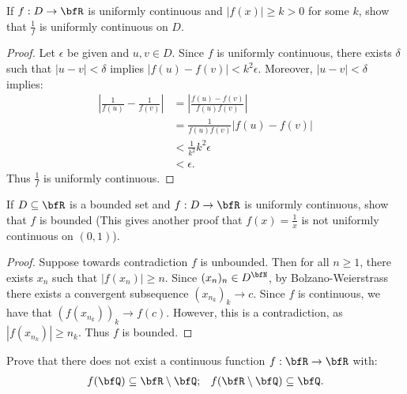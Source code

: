 \documentclass[11pt,twoside,openany]{memoir}
\begin{document}
    \begin{exercise}
        If $f:D \rightarrow \bfR$ is uniformly continuous and $|f(x)| \geq k > 0$ for some $k$, show that $\frac{1}{f}$ is uniformly continuous on $D$.
    \end{exercise}  
        \begin{proof}
            Let $\epsilon$ be given and $u,v \in D$. Since $f$ is uniformly continuous, there exists $\delta$ such that $|u-v| < \delta$ implies $|f(u)-f(v)| < k^2 \epsilon$. Moreover, $|u-v| < \delta$ implies:
                \begin{equation*}
                \begin{split}
                    \left|\frac{1}{f(u)} - \frac{1}{f(v)}\right|
                    & = \left|\frac{f(u) - f(v)}{f(u)f(v)}\right| \\
                    & = \frac{1}{f(u)f(v)}\left|f(u) - f(v)\right| \\
                    & < \frac{1}{k^2} k^2 \epsilon \\
                    & < \epsilon.
                \end{split}
                \end{equation*}
            Thus $\frac{1}{f}$ is uniformly continuous.
        \end{proof}
    \begin{exercise}
        If $D \subseteq \bfR$ is a bounded set and $f:D \rightarrow \bfR$ is uniformly continuous, show that $f$ is bounded (This gives another proof that $f(x) = \frac{1}{x}$ is not uniformly continuous on $(0,1)$).
    \end{exercise}
        \begin{proof}
            Suppose towards contradiction $f$ is unbounded. Then for all $n\geq 1$, there exists $x_n$ such that $|f(x_n)| \geq n$. Since $(x_n)_n \in D^\bfN$, by Bolzano-Weierstrass there exists a convergent subsequence $(x_{n_k})_k \rightarrow c$. Since $f$ is continuous, we have that $(f(x_{n_k}))_k \rightarrow f(c)$. However, this is a contradiction, as $|f(x_{n_k})| \geq n_k$. Thus $f$ is bounded.
        \end{proof}
    \begin{exercise}
        Prove that there does not exist a continuous function $f:\bfR \rightarrow \bfR$ with:
            \begin{equation*}
            \begin{split}
                f(\bfQ) \subseteq \bfR \setminus \bfQ; \hspace{8pt} f(\bfR \setminus \bfQ) \subseteq \bfQ.
            \end{split}
            \end{equation*}
    \end{exercise}
\end{document}
